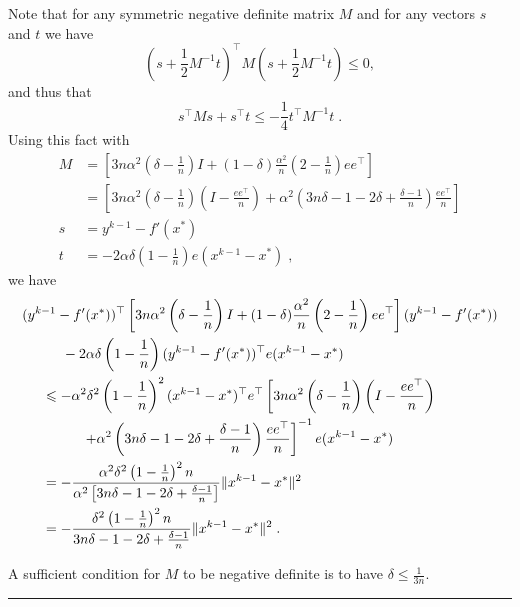 \documentclass{article}
\newcommand{\idm}{I}
\newcommand{\BlackBox}{\rule{1.5ex}{1.5ex}}  %
\newenvironment{proof}{\par\noindent{\bf Proof\ }}{\hfill\BlackBox\\[2mm]}
\begin{document}
\begin{proof}
Note that for any symmetric negative definite matrix $M$ and for any vectors $s$ and $t$ we have
\[
(s + \frac{1}{2}M^{-1}t)^\top M (s + \frac{1}{2}M^{-1}t) \leqslant 0,
\]
and thus that
\[
s^\top M s + s^\top t \leqslant -\frac{1}{4} t^\top M^{-1} t \; .
\]
Using this fact with
\begin{align*}
M &= \left[
3 n \alpha^2 \left( \delta - \frac{1}{n} \right) \idm
+ ( 1 - \delta) \frac{\alpha^2}{n} \left( 2 - \frac{1}{n} \right) ee^\top
\right]\\
&=
\left[
3 n \alpha^2 \left( \delta - \frac{1}{n} \right) \left( \idm - \frac{ee^\top}{n}\right)
+ \alpha^2\left(3n\delta - 1- 2\delta + \frac{\delta - 1}{n}\right) \frac{ee^\top}{n}
\right]\\
s &= y^{k-1} - f'(x^\ast)\\
t &= - 2\alpha \delta \left(1-\frac{1}{n}\right)e (x^{k-1} -x^\ast) \; ,
\end{align*}
we have
\begin{align*}
&(y^{k-1} - f'(x^\ast))^\top \left[
3 n \alpha^2 \left( \delta - \frac{1}{n} \right) \idm
+ ( 1 - \delta) \frac{\alpha^2}{n} \left( 2 - \frac{1}{n} \right) ee^\top
\right] (y^{k-1} - f'(x^\ast))\\
& \hspace*{1cm} - 2\alpha \delta \left(1-\frac{1}{n}\right)(y^{k-1} - f'(x^\ast))^\top  e (x^{k-1} -x^\ast)\\
& \hspace*{.5cm} \leqslant -\alpha^2\delta^2\left(1-\frac{1}{n}\right)^2 (x^{k-1} -x^\ast)^\top e^\top \left[
3 n \alpha^2 \left( \delta - \frac{1}{n} \right) \left( \idm - \frac{ee^\top}{n}\right) \right. \\
& \hspace*{1.5cm}
\left.+ \alpha^2\left(3n\delta - 1- 2\delta + \frac{\delta - 1}{n}\right) \frac{ee^\top}{n}
\right]^{-1} e (x^{k-1} -x^\ast)\\
&\hspace*{.5cm}= -\frac{\alpha^2\delta^2\left(1-\frac{1}{n}\right)^2n}{\alpha^2\left[3n\delta - 1- 2\delta + \frac{\delta - 1}{n}\right]} \|x^{k-1} -x^\ast\|^2\\
&\hspace*{.5cm}= -\frac{\delta^2\left(1-\frac{1}{n}\right)^2n}{3n\delta - 1- 2\delta + \frac{\delta - 1}{n}} \|x^{k-1} -x^\ast\|^2 \; .
\end{align*}

A %
sufficient condition for $M$ to be negative definite is to have $\delta \leqslant \frac{1}{3n}$.


\end{proof}
\end{document}
